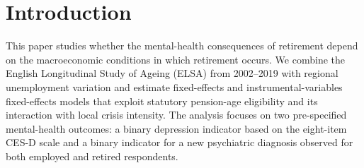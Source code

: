 \documentclass[arguments, manuscript, 11pt]{aastex631}
\begin{document}




\setcounter{page}{0}
\thispagestyle{empty}
\pagebreak 

\newpage


\section{Introduction} \label{sec:introduction}

This paper studies whether the mental-health consequences of retirement depend on the macroeconomic conditions in which retirement occurs. We combine the English Longitudinal Study of Ageing (ELSA) from 2002--2019 with regional unemployment variation and estimate fixed-effects and instrumental-variables fixed-effects models that exploit statutory pension-age eligibility and its interaction with local crisis intensity. The analysis focuses on two pre-specified mental-health outcomes: a binary depression indicator based on the eight-item CES-D scale and a binary indicator for a new psychiatric diagnosis observed for both employed and retired respondents.
\end{document}
